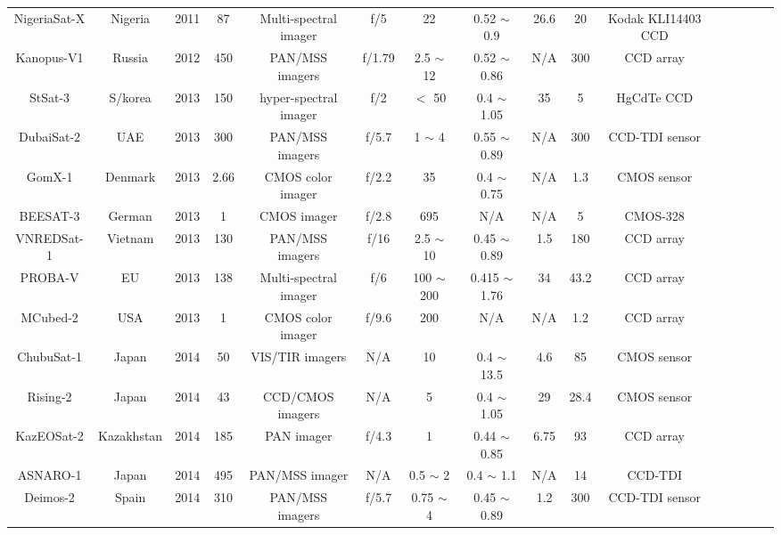 \documentclass[final,5p,times,twocolumn]{elsarticle}
\begin{document}
\begin{table}
{\begin{tabular}{c c c c c c c c c c c c c c c c}
		    NigeriaSat-X & Nigeria & 2011 & 87 & Multi-spectral imager &  f/5 & 22 & 0.52 $\sim$ 0.9 &  26.6 & 20 &   Kodak KLI14403 CCD & \citep{eoportal}\\	    
		    Kanopus-V1 & Russia & 2012 & 450 & PAN/MSS imagers & f/1.79 & 2.5 $\sim$ 12 & 0.52 $\sim$ 0.86 & N/A & 300 &CCD array & \citep{eoportal}\\	
		    StSat-3 & S/korea & 2013 & 150 & hyper-spectral imager & f/2 & $<$ 50 & 0.4 $\sim$ 1.05 & 35 & 5 & HgCdTe CCD & \citep{lee2007compact}\\	
		    DubaiSat-2 & UAE & 2013 & 300 & PAN/MSS imagers & f/5.7 & 1 $\sim$ 4 & 0.55 $\sim$ 0.89 & N/A & 300 &  CCD-TDI sensor & \citep{bushahab2014cal}\\
		    GomX-1 & Denmark & 2013 & 2.66 & CMOS color imager & f/2.2 & 35 & 0.4 $\sim$ 0.75 &  N/A &  1.3 & CMOS sensor & \citep{gomspace2023}\\		 
		    BEESAT-3 & German & 2013 & 1 & CMOS imager & f/2.8 & 695 & N/A &  N/A & 5 & CMOS-328 & \citep{eoportal}\\		    
		    VNREDSat-1 & Vietnam & 2013 & 130 & PAN/MSS imagers & f/16 & 2.5 $\sim$ 10 & 0.45 $\sim$ 0.89 &1.5 & 180 & CCD array & \citep{eoportal}\\	
		    PROBA-V & EU & 2013 & 138 & Multi-spectral imager & f/6 & 100 $\sim$ 200 & 0.415 $\sim$ 1.76 &  34 & 43.2 &  CCD array & \citep{eoportal}\\		    
		    MCubed-2 & USA & 2013 & 1 & CMOS color imager & f/9.6 & 200 & N/A & N/A & 1.2 &  CCD array & \citep{bekker2010cubesat}\\		   
		    ChubuSat-1 & Japan & 2014 & 50 & VIS/TIR imagers & N/A & 10 & 0.4 $\sim$ 13.5 &  4.6 & 85 &  CMOS sensor & \citep{ Narusawa2012DEVELOPMENTOC}\\		
		    Rising-2 & Japan & 2014 & 43 & CCD/CMOS imagers & N/A & 5 & 0.4 $\sim$ 1.05 &  29 & 28.4 &CMOS sensor & \citep{sakamoto2010development}\\		    
		    KazEOSat-2 & Kazakhstan & 2014 & 185 & PAN imager & f/4.3 & 1 & 0.44 $\sim$ 0.85 & 6.75 & 93 &  CCD array & \citep{kurczynski2016possibilities} \\		 
		    ASNARO-1 & Japan & 2014 & 495 & PAN/MSS imager & N/A & 0.5 $\sim$ 2 & 0.4 $\sim$ 1.1 & N/A & 14 &  CCD-TDI & \citep{eoportal}\\		
		    Deimos-2 & Spain & 2014 & 310 & PAN/MSS imagers & f/5.7 & 0.75 $\sim$ 4 & 0.45 $\sim$ 0.89 &  1.2 & 300 &  CCD-TDI sensor & \cite{ pirondini2014deimos}\\		

\end{tabular}}
\end{table}
\end{document}
